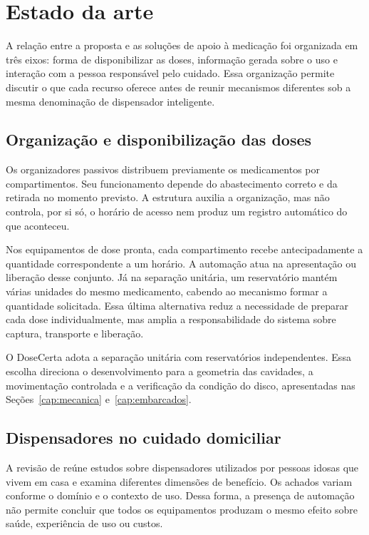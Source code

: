 \section{Estado da arte}\label{cap:estadoarte}
A relação entre a proposta e as soluções de apoio à medicação foi organizada em três eixos: forma de disponibilizar as doses, informação gerada sobre o uso e interação com a pessoa responsável pelo cuidado. Essa organização permite discutir o que cada recurso oferece antes de reunir mecanismos diferentes sob a mesma denominação de dispensador inteligente.

\subsection{Organização e disponibilização das doses}
Os organizadores passivos distribuem previamente os medicamentos por compartimentos. Seu funcionamento depende do abastecimento correto e da retirada no momento previsto. A estrutura auxilia a organização, mas não controla, por si só, o horário de acesso nem produz um registro automático do que aconteceu.

Nos equipamentos de dose pronta, cada compartimento recebe antecipadamente a quantidade correspondente a um horário. A automação atua na apresentação ou liberação desse conjunto. Já na separação unitária, um reservatório mantém várias unidades do mesmo medicamento, cabendo ao mecanismo formar a quantidade solicitada. Essa última alternativa reduz a necessidade de preparar cada dose individualmente, mas amplia a responsabilidade do sistema sobre captura, transporte e liberação.

O DoseCerta adota a separação unitária com reservatórios independentes. Essa escolha direciona o desenvolvimento para a geometria das cavidades, a movimentação controlada e a verificação da condição do disco, apresentadas nas Seções~\ref{cap:mecanica} e~\ref{cap:embarcados}.

\subsection{Dispensadores no cuidado domiciliar}
A revisão de  reúne estudos sobre dispensadores utilizados por pessoas idosas que vivem em casa e examina diferentes dimensões de benefício. Os achados variam conforme o domínio e o contexto de uso. Dessa forma, a presença de automação não permite concluir que todos os equipamentos produzam o mesmo efeito sobre saúde, experiência de uso ou custos.

